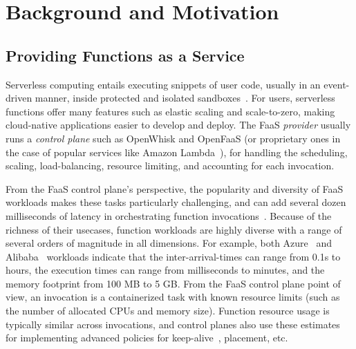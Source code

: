 \vspace*{-0.3cm}
\section{Background and Motivation}
\vspace*{\subsecspace}
\label{sec:bg}

\subsection{Providing Functions as a Service}

Serverless computing entails executing snippets of user code, usually in an event-driven manner, inside protected and isolated sandboxes~\cite{serverless-cacm-21}.
For users, serverless functions offer many features such as elastic scaling and scale-to-zero, making cloud-native applications easier to develop and deploy. 
The FaaS \emph{provider} usually runs a \emph{control plane} such as OpenWhisk and OpenFaaS (or proprietary ones in the case of popular services like Amazon Lambda~\cite{aws-lambda}), for handling the scheduling, scaling, load-balancing, resource limiting, and accounting for each invocation. 

From the FaaS control plane's perspective, the popularity and diversity of FaaS workloads makes these tasks particularly challenging, and can add several dozen milliseconds of latency in orchestrating function invocations~\cite{cvetkovic2024dirigent, fuerst2023iluvatar, serverless-cluster-cost}.
Because of the richness of their usecases, function workloads are highly diverse with a range of several orders of magnitude in all dimensions.
For example, both Azure~\cite{shahrad2020serverless} and Alibaba~\cite{luo2021characterizing} workloads indicate that the inter-arrival-times can range from 0.1s to hours, the execution times can range from milliseconds to minutes, and the memory footprint from 100 MB to 5 GB. 
From the FaaS control plane point of view, an invocation is a  containerized task with known resource limits (such as the number of allocated CPUs and memory size).
Function resource usage is typically similar across invocations, and control planes also use these estimates for implementing advanced policies for keep-alive~\cite{roy2022icebreaker,faascache-asplos21}, placement, etc. 


